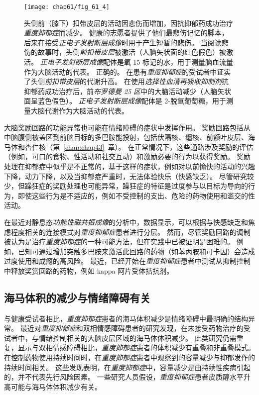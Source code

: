 \begin{figure}[htbp]
	\centering
	\texttt{[image: chap61/fig\_61\_4]}
	\caption{头侧前（膝下）扣带皮层的活动因悲伤而增加，因抗抑郁药成功治疗\textit{重度抑郁症}而减少\cite{mayberg1997cingulate}。
		 健康的志愿者提供了他们最悲伤记忆的脚本，后来在接受\textit{正电子发射断层成像}时用于产生短暂的悲伤。
		 当阅读悲伤的故事时，头侧\textit{前扣带皮层}被激活（人脑矢状面的红色假色）被激活。
		 \textit{正电子发射断层成像}配体是氧 15 标记的水，用于测量脑血流量作为大脑活动的代表。 正确的。
		 在患有\textit{重度抑郁症}的受试者中证实了头侧\textit{前扣带皮层}的代谢升高。
		 在使用\textit{选择性血清再吸收抑制剂}抗抑郁药成功治疗后，前\textit{布罗德曼 25 区}中的大脑活动减少（人脑矢状面呈蓝色假色）。
		 \textit{正电子发射断层成像}配体是 2-脱氧葡萄糖，用于测量大脑代谢作为大脑活动的代表。}
	\label{fig:61_4}
\end{figure}


大脑奖励回路的功能异常也可能在情绪障碍的症状中发挥作用。
奖励回路包括从中脑腹侧被盖区到前脑目标的多巴胺能投射，包括伏隔核、缰核、前额叶皮层、海马体和杏仁核（第~\ref{chap:chap43}~章）。
在正常情况下，这些通路涉及奖励的评估（例如，可口的食物、性活动和社交互动）和激励必要的行为以获得奖励。
奖励处理在抑郁症中似乎是不正常的，基于这样的症状，例如对以前愉快的活动的兴趣下降，动力下降，以及当抑郁症严重时，无法体验快乐（快感缺乏）。
尽管研究较少，但躁狂症的奖励处理也可能异常，躁狂症的特征是过度参与以目标为导向的行为，即使这些行为是不适应的，例如不受控制的支出、危险的药物使用和滥交的性活动。


在最近对静息态\textit{功能性磁共振成像}的分析中，数据显示，可以根据与快感缺乏和焦虑程度相关的连接模式对\textit{重度抑郁症}患者进行分层。
然而，尽管奖励回路的调制被认为是治疗\textit{重度抑郁症}的一种可能方法，但在实践中已被证明是困难的。
例如，已知可通过增加突触多巴胺来激活此回路的药物（如苯丙胺和可卡因）会造成过度使用和成瘾的高风险。
最近，已经开始在\textit{重度抑郁症}患者中测试从抑制控制中释放奖赏回路的药物，例如 kappa 阿片受体拮抗剂。



\subsection{海马体积的减少与情绪障碍有关}

与健康受试者相比，\textit{重度抑郁症}患者的海马体积减少是情绪障碍中最明确的结构异常。
最近对\textit{重度抑郁症}和双相情感障碍患者的研究发现，在未接受药物治疗的受试者中，与情绪控制相关的大脑皮层区域的海马体体积减少。
此类研究仍需重复，显示与双相情感障碍相比，\textit{重度抑郁症}患者的体积减少有重叠和非重叠模式。
在控制药物使用持续时间时，在\textit{重度抑郁症}患者中观察到的容量减少与抑郁发作的持续时间相关。
这些发现表明，在\textit{重度抑郁症}中，容量减少是由持续性疾病引起的，并不代表先行风险因素。
一些研究人员假设，\textit{重度抑郁症}患者皮质醇水平升高可能与海马体体积减少有关。


